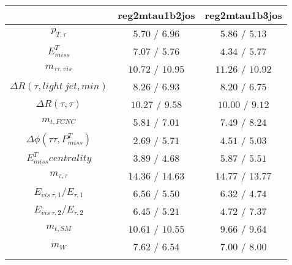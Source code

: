 \centering
\begin{tabular}{ccc} \toprule\toprule
 & reg2mtau1b2jos & reg2mtau1b3jos\\\midrule
$p_{T,\tau }$ & $5.70$ / $6.96$ & $5.86$ / $5.13$\\
$E^{T}_{miss}$ & $7.07$ / $5.76$ & $4.34$ / $5.77$\\
$m_{\tau \tau ,vis}$ & $10.72$ / $10.95$ & $11.26$ / $10.92$\\
$\Delta R(\tau ,light~jet,min)$ & $8.26$ / $6.93$ & $8.20$ / $6.75$\\
$\Delta R(\tau ,\tau )$ & $10.27$ / $9.58$ & $10.00$ / $9.12$\\
$m_{t,FCNC}$ & $5.81$ / $7.01$ & $7.49$ / $8.24$\\
$\Delta\phi(\tau \tau ,P^{T}_{miss})$ & $2.69$ / $5.71$ & $4.51$ / $5.03$\\
$E^{T}_{miss} centrality$ & $3.89$ / $4.68$ & $5.87$ / $5.51$\\
$m_{\tau ,\tau }$ & $14.36$ / $14.63$ & $14.77$ / $13.77$\\
$E_{vis~\tau ,1}/E_{\tau ,1}$ & $6.56$ / $5.50$ & $6.32$ / $4.74$\\
$E_{vis~\tau ,2}/E_{\tau ,2}$ & $6.45$ / $5.21$ & $4.72$ / $7.37$\\
$m_{t,SM}$ & $10.61$ / $10.55$ & $9.66$ / $9.64$\\
$m_{W}$ & $7.62$ / $6.54$ & $7.00$ / $8.00$\\
\bottomrule\bottomrule\\
\end{tabular}
